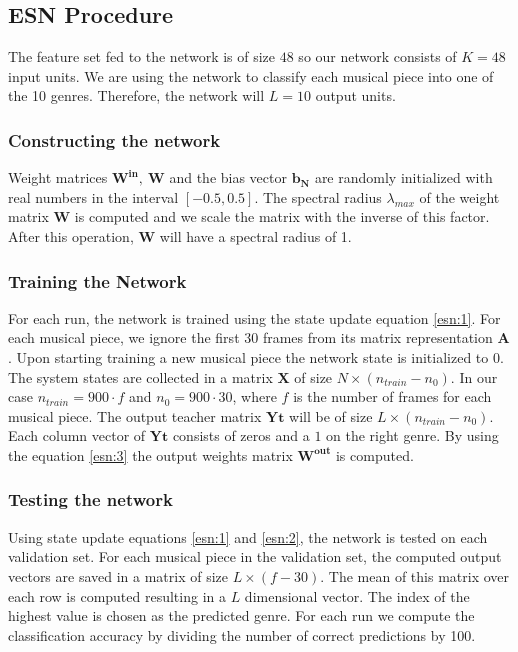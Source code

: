 \documentclass[a4paper,11pt,oneside]{article}
\begin{document}
\subsection{ESN Procedure}
The feature set fed to the network is of size $48$ so our network consists of $K=48$
input units. We are using the network to classify each musical piece into one of the 10 genres.
Therefore, the network will $L=10$ output units.
\subsubsection{Constructing the network}
Weight matrices $\mathbf{W^{in},\ W}$ and the bias vector $\mathbf{b_N}$ are randomly initialized with real numbers
in the interval $[-0.5,0.5]$. The spectral radius $\lambda_{max}$ of the weight matrix $\mathbf{W}$ is computed 
and we scale the matrix with the inverse of this factor. After this operation, $\mathbf{W}$ will have a spectral 
radius of 1.
\subsubsection{Training the Network}
For each run, the network is trained using the state update equation \ref{esn:1}. For each musical piece, 
we ignore the first 30 frames from its matrix representation $\mathbf{A}$. Upon starting training a new musical 
piece the network state is initialized to $0$. The system states are collected in a matrix $\mathbf{X}$ of size 
$N\times (n_{train}-n_0)$. In our case $n_{train} = 900\cdot f$ and $n_0 = 900\cdot 30$, where $f$ is the number of 
frames for each musical piece. The output teacher matrix $\mathbf{Yt}$ will be of size $L\times (n_{train}-n_0)$. 
Each column vector of $\mathbf{Yt}$ consists of zeros and a $1$ on the right genre. By using the equation \ref{esn:3} 
the output weights matrix $\mathbf{W^{out}}$ is computed.
\subsubsection{Testing the network}
Using state update equations \ref{esn:1} and \ref{esn:2}, the network is tested on each validation set.
For each musical piece in the validation set, the computed output vectors are saved in a matrix of size 
$L\times (f-30)$. The mean of this matrix over each row is computed resulting in a $L$ dimensional vector. 
The index of the highest value is chosen as the predicted genre. For each run we compute the classification accuracy
by dividing the number of correct predictions by 100.


\nocite{*}
\newpage


\end{document}
